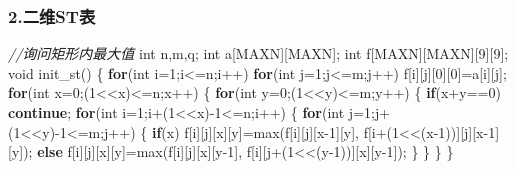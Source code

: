 \documentclass[
]{article}
\newenvironment{Shaded}{}{}
\newcommand{\CommentTok}[1]{\textcolor[rgb]{0.38,0.63,0.69}{\textit{#1}}}
\newcommand{\ControlFlowTok}[1]{\textcolor[rgb]{0.00,0.44,0.13}{\textbf{#1}}}
\newcommand{\DataTypeTok}[1]{\textcolor[rgb]{0.56,0.13,0.00}{#1}}
\newcommand{\DecValTok}[1]{\textcolor[rgb]{0.25,0.63,0.44}{#1}}
\newcommand{\NormalTok}[1]{#1}
\begin{document}
\hypertarget{ux4e8cux7ef4stux8868}{%
\subsubsection{2.二维ST表}\label{ux4e8cux7ef4stux8868}}

\begin{Shaded}
\begin{Highlighting}[]
\CommentTok{//询问矩形内最大值}
\DataTypeTok{int}\NormalTok{ n,m,q;}
\DataTypeTok{int}\NormalTok{ a[MAXN][MAXN];}
\DataTypeTok{int}\NormalTok{ f[MAXN][MAXN][}\DecValTok{9}\NormalTok{][}\DecValTok{9}\NormalTok{];}
\DataTypeTok{void}\NormalTok{ init\_st()}
\NormalTok{\{}
    \ControlFlowTok{for}\NormalTok{(}\DataTypeTok{int}\NormalTok{ i=}\DecValTok{1}\NormalTok{;i\textless{}=n;i++)}
        \ControlFlowTok{for}\NormalTok{(}\DataTypeTok{int}\NormalTok{ j=}\DecValTok{1}\NormalTok{;j\textless{}=m;j++)}
\NormalTok{            f[i][j][}\DecValTok{0}\NormalTok{][}\DecValTok{0}\NormalTok{]=a[i][j];}
    \ControlFlowTok{for}\NormalTok{(}\DataTypeTok{int}\NormalTok{ x=}\DecValTok{0}\NormalTok{;(}\DecValTok{1}\NormalTok{\textless{}\textless{}x)\textless{}=n;x++)}
\NormalTok{    \{}
        \ControlFlowTok{for}\NormalTok{(}\DataTypeTok{int}\NormalTok{ y=}\DecValTok{0}\NormalTok{;(}\DecValTok{1}\NormalTok{\textless{}\textless{}y)\textless{}=m;y++)}
\NormalTok{        \{}
            \ControlFlowTok{if}\NormalTok{(x+y==}\DecValTok{0}\NormalTok{) }\ControlFlowTok{continue}\NormalTok{;}
            \ControlFlowTok{for}\NormalTok{(}\DataTypeTok{int}\NormalTok{ i=}\DecValTok{1}\NormalTok{;i+(}\DecValTok{1}\NormalTok{\textless{}\textless{}x){-}}\DecValTok{1}\NormalTok{\textless{}=n;i++)}
\NormalTok{            \{}
                \ControlFlowTok{for}\NormalTok{(}\DataTypeTok{int}\NormalTok{ j=}\DecValTok{1}\NormalTok{;j+(}\DecValTok{1}\NormalTok{\textless{}\textless{}y){-}}\DecValTok{1}\NormalTok{\textless{}=m;j++)}
\NormalTok{                \{}
                    \ControlFlowTok{if}\NormalTok{(x) f[i][j][x][y]=max(f[i][j][x{-}}\DecValTok{1}\NormalTok{][y],}
\NormalTok{                        f[i+(}\DecValTok{1}\NormalTok{\textless{}\textless{}(x{-}}\DecValTok{1}\NormalTok{))][j][x{-}}\DecValTok{1}\NormalTok{][y]);}
                    \ControlFlowTok{else}\NormalTok{ f[i][j][x][y]=max(f[i][j][x][y{-}}\DecValTok{1}\NormalTok{],}
\NormalTok{                       f[i][j+(}\DecValTok{1}\NormalTok{\textless{}\textless{}(y{-}}\DecValTok{1}\NormalTok{))][x][y{-}}\DecValTok{1}\NormalTok{]);}
\NormalTok{                \}}
\NormalTok{            \}}
\NormalTok{        \}}
\NormalTok{    \}}

\end{Highlighting}
\end{Shaded}
\end{document}
